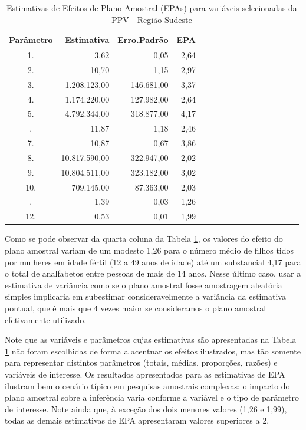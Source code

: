 \documentclass[]{book}
\theoremstyle{definition}
\theoremstyle{definition}
\theoremstyle{definition}
\theoremstyle{remark}
\begin{document}
\begin{table}

\caption{\label{tab:epas}Estimativas de Efeitos de Plano Amostral (EPAs)
para variáveis selecionadas da PPV - Região Sudeste}
\centering
\begin{tabular}[t]{crrrcrrrcrrrcrrr}
\toprule
Parâmetro & Estimativa & Erro.Padrão & EPA\\
\midrule
1. & 3,62 & 0,05 & 2,64\\
2. & 10,70 & 1,15 & 2,97\\
3. & 1.208.123,00 & 146.681,00 & 3,37\\
4. & 1.174.220,00 & 127.982,00 & 2,64\\
5. & 4.792.344,00 & 318.877,00 & 4,17\\
\addlinespace
6. & 11,87 & 1,18 & 2,46\\
7. & 10,87 & 0,67 & 3,86\\
8. & 10.817.590,00 & 322.947,00 & 2,02\\
9. & 10.804.511,00 & 323.182,00 & 3,02\\
10. & 709.145,00 & 87.363,00 & 2,03\\
\addlinespace
11. & 1,39 & 0,03 & 1,26\\
12. & 0,53 & 0,01 & 1,99\\
\bottomrule
\end{tabular}
\end{table}

Como se pode observar da quarta coluna da Tabela \ref{tab:epas}, os
valores do efeito do plano amostral variam de um modesto 1,26 para o
número médio de filhos tidos por mulheres em idade fértil (12 a 49 anos
de idade) até um substancial 4,17 para o total de analfabetos entre
pessoas de mais de 14 anos. Nesse último caso, usar a estimativa de
variância como se o plano amostral fosse amostragem aleatória simples
implicaria em subestimar consideravelmente a variância da estimativa
pontual, que é mais que 4 vezes maior se consideramos o plano amostral
efetivamente utilizado.

Note que as variáveis e parâmetros cujas estimativas são apresentadas na
Tabela \ref{tab:epas} não foram escolhidas de forma a acentuar os
efeitos ilustrados, mas tão somente para representar distintos
parâmetros (totais, médias, proporções, razões) e variáveis de
interesse. Os resultados apresentados para as estimativas de EPA
ilustram bem o cenário típico em pesquisas amostrais complexas: o
impacto do plano amostral sobre a inferência varia conforme a variável e
o tipo de parâmetro de interesse. Note ainda que, à exceção dos dois
menores valores (1,26 e 1,99), todas as demais estimativas de EPA
apresentaram valores superiores a 2.
\end{document}

